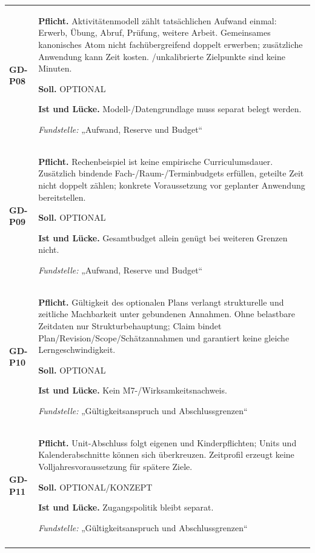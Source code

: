 \begin{longtable}{@{}P{20mm}P{128mm}@{}}
\label{rule:GD-P08}\textbf{GD-P08} &
\textbf{Pflicht.} Aktivitätenmodell zählt tatsächlichen Aufwand einmal: Erwerb, Übung, Abruf, Prüfung, weitere Arbeit. Gemeinsames kanonisches Atom nicht fachübergreifend doppelt erwerben; zusätzliche Anwendung kann Zeit kosten. /unkalibrierte Zielpunkte sind keine Minuten.\par\smallskip
\textbf{Soll.} OPTIONAL\par\smallskip
\textbf{Ist und Lücke.} Modell-/Datengrundlage muss separat belegt werden.\par\smallskip
\emph{Fundstelle:} „Aufwand, Reserve und Budget“\\\addlinespace[5pt]
\label{rule:GD-P09}\textbf{GD-P09} &
\textbf{Pflicht.} Rechenbeispiel ist keine empirische Curriculumsdauer. Zusätzlich bindende Fach-/Raum-/Terminbudgets erfüllen, geteilte Zeit nicht doppelt zählen; konkrete Voraussetzung vor geplanter Anwendung bereitstellen.\par\smallskip
\textbf{Soll.} OPTIONAL\par\smallskip
\textbf{Ist und Lücke.} Gesamtbudget allein genügt bei weiteren Grenzen nicht.\par\smallskip
\emph{Fundstelle:} „Aufwand, Reserve und Budget“\\\addlinespace[5pt]
\label{rule:GD-P10}\textbf{GD-P10} &
\textbf{Pflicht.} Gültigkeit des optionalen Plans verlangt strukturelle und zeitliche Machbarkeit unter gebundenen Annahmen. Ohne belastbare Zeitdaten nur Strukturbehauptung; Claim bindet Plan/Revision/Scope/Schätzannahmen und garantiert keine gleiche Lerngeschwindigkeit.\par\smallskip
\textbf{Soll.} OPTIONAL\par\smallskip
\textbf{Ist und Lücke.} Kein M7-/Wirksamkeitsnachweis.\par\smallskip
\emph{Fundstelle:} „Gültigkeitsanspruch und Abschlussgrenzen“\\\addlinespace[5pt]
\label{rule:GD-P11}\textbf{GD-P11} &
\textbf{Pflicht.} Unit-Abschluss folgt eigenen und Kinderpflichten; Units und Kalenderabschnitte können sich überkreuzen. Zeitprofil erzeugt keine Volljahresvoraussetzung für spätere Ziele.\par\smallskip
\textbf{Soll.} OPTIONAL/KONZEPT\par\smallskip
\textbf{Ist und Lücke.} Zugangspolitik bleibt separat.\par\smallskip
\emph{Fundstelle:} „Gültigkeitsanspruch und Abschlussgrenzen“\\\addlinespace[5pt]
\bottomrule
\end{longtable}
\endgroup

